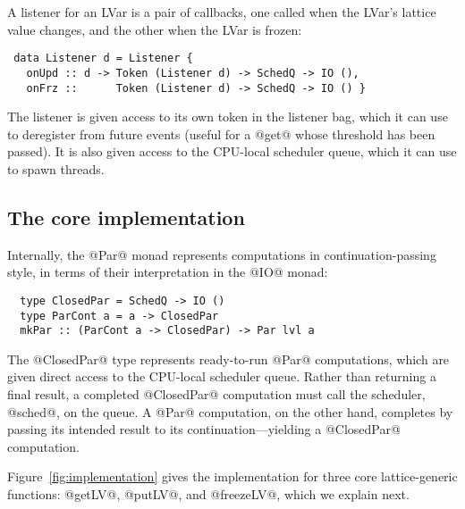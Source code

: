 A listener for an LVar is a pair of callbacks,
one called when the LVar's lattice value changes,
 and the other when the LVar is frozen:  
\begin{lstlisting}
 data Listener d = Listener {
   onUpd :: d -> Token (Listener d) -> SchedQ -> IO (),
   onFrz ::      Token (Listener d) -> SchedQ -> IO () }
\end{lstlisting}
The listener is given access to its own token in the listener bag, which it can
use to deregister from future events (useful for a @get@ whose threshold has
been passed).  It is also given access to the CPU-local scheduler queue, which
it can use to spawn threads.

\subsection{The core implementation}

Internally, the @Par@ monad represents computations in continuation-passing
style, in terms of their interpretation in the @IO@ monad:
\begin{lstlisting}
  type ClosedPar = SchedQ -> IO ()
  type ParCont a = a -> ClosedPar
  mkPar :: (ParCont a -> ClosedPar) -> Par lvl a
\end{lstlisting}
The @ClosedPar@ type represents ready-to-run @Par@ computations, which are given
direct access to the CPU-local scheduler queue.  Rather than returning a final
result, a completed @ClosedPar@ computation must call the scheduler, @sched@, on
the queue.  A @Par@ computation, on the other hand, completes by passing its
intended result to its continuation---yielding a @ClosedPar@ computation.

Figure~\ref{fig:implementation} gives the implementation for three core
lattice-generic functions: @getLV@, @putLV@, and @freezeLV@, which we explain next.

